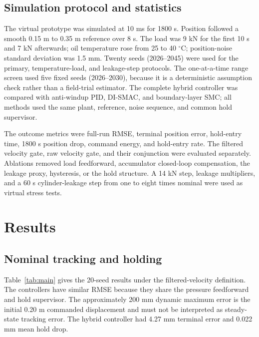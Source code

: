 \documentclass[agriengineering,article,submit,moreauthors]{Definitions/mdpi}
\begin{document}
\subsection{Simulation protocol and statistics}
The virtual prototype was simulated at 10 ms for 1800 s. Position followed a smooth 0.15 m to 0.35 m reference over 8 s. The load was 9 kN for the first 10 s and 7 kN afterwards; oil temperature rose from 25 to 40 $^\circ$C; position-noise standard deviation was 1.5 mm. Twenty seeds (2026--2045) were used for the primary, temperature-load, and leakage-step protocols. The one-at-a-time range screen used five fixed seeds (2026--2030), because it is a deterministic assumption check rather than a field-trial estimator. The complete hybrid controller was compared with anti-windup PID, DI-SMAC, and boundary-layer SMC; all methods used the same plant, reference, noise sequence, and common hold supervisor.

The outcome metrics were full-run RMSE, terminal position error, hold-entry time, 1800 s position drop, command energy, and hold-entry rate. The filtered velocity gate, raw velocity gate, and their conjunction were evaluated separately. Ablations removed load feedforward, accumulator closed-loop compensation, the leakage proxy, hysteresis, or the hold structure. A 14 kN step, leakage multipliers, and a 60 s cylinder-leakage step from one to eight times nominal were used as virtual stress tests.

\section{Results}
\subsection{Nominal tracking and holding}
Table~\ref{tab:main} gives the 20-seed results under the filtered-velocity definition. The controllers have similar RMSE because they share the pressure feedforward and hold supervisor. The approximately 200 mm dynamic maximum error is the initial 0.20 m commanded displacement and must not be interpreted as steady-state tracking error. The hybrid controller had 4.27 mm terminal error and 0.022 mm mean hold drop.
\end{document}
